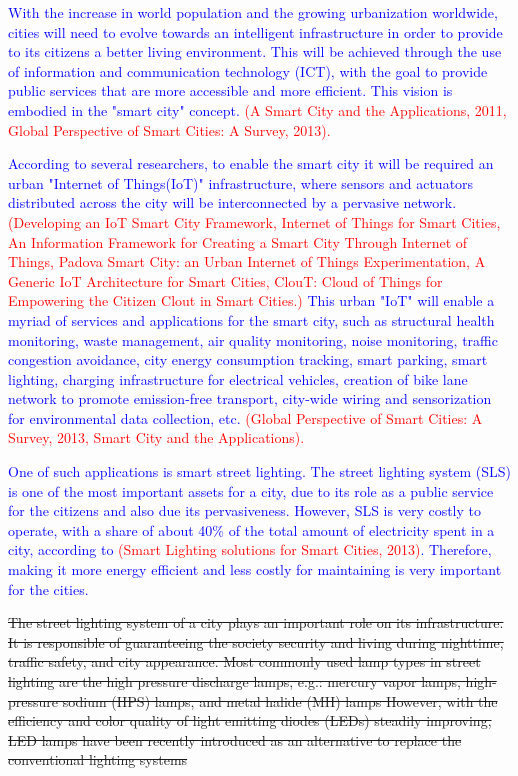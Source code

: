 \documentclass[authoryear,preprint,review,12pt]{elsarticle}
\newcommand{\rev}{\textcolor{blue}}
\newcommand{\refs}{\textcolor{red}}
\begin{document}
\rev{With  the increase in world population and the growing urbanization worldwide, cities will need to evolve towards an intelligent infrastructure in order to provide to its citizens a better living environment. This will be achieved through the use of information and communication technology (ICT), with the goal to provide public services that are more accessible and more efficient. This vision is embodied in the "smart city" concept. \refs{(A Smart City and the Applications, 2011, Global Perspective of Smart Cities: A Survey, 2013).}} 

\rev{According to several researchers, to enable the smart city it will be required an urban "Internet of Things(IoT)" infrastructure, where sensors and actuators distributed across the city will be interconnected by a pervasive network. \refs{(Developing an IoT Smart City Framework, Internet of Things for Smart Cities, An Information Framework for Creating a Smart City Through Internet of Things, Padova Smart City: an Urban Internet of Things Experimentation, A Generic IoT Architecture for Smart Cities, ClouT: Cloud of Things for Empowering the Citizen Clout in Smart Cities.)} This urban "IoT" will enable a myriad of services and applications for the smart city, such as structural health monitoring, waste management, air quality monitoring, noise monitoring, traffic congestion avoidance, city energy consumption tracking, smart parking, smart lighting, charging infrastructure for electrical vehicles, creation of bike lane network to promote emission-free transport, city-wide wiring and sensorization for environmental data collection, etc. \refs{(Global Perspective of Smart Cities: A Survey, 2013, Smart City and the Applications).}}

\rev{One of such applications is smart street lighting. The street lighting system (SLS) is one of the most important assets for a city, due to its role as a public service for the citizens and also due its pervasiveness. However, SLS is very costly to operate, with a share of about 40\% of the total amount of electricity spent in a city, according to \refs{(Smart Lighting solutions for Smart Cities, 2013)}. Therefore, making it more energy efficient and less costly for maintaining is very important for the cities.}

\sout{The street lighting system of a city plays an important role on its infrastructure. It is responsible of guaranteeing the society security and living during nighttime, traffic safety, and city appearance. Most commonly used lamp types in street lighting are the high pressure discharge lamps, e.g.: mercury vapor lamps, high-pressure sodium (HPS) lamps, and metal halide (MH) lamps %
However, with the efficiency and color quality of light emitting diodes (LEDs) steadily improving, LED lamps have been recently introduced as an alternative to replace the conventional lighting systems %
} 
\end{document}
